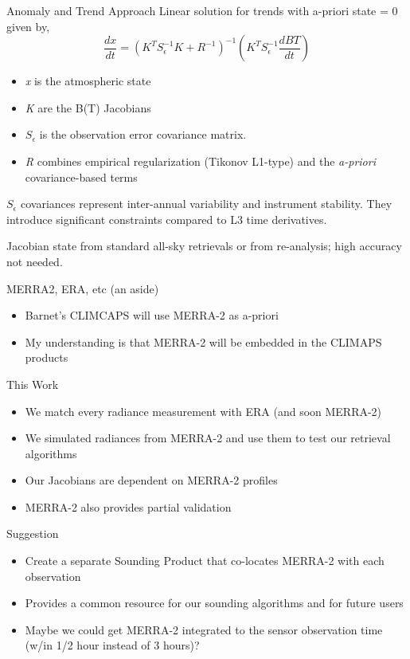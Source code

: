 \documentclass[10pt,t]{beamer}
\begin{document}
\begin{frame}[label={sec:orga73479f}]{Anomaly and Trend Approach}
Linear solution for trends with a-priori state = 0 given by,
\begin{displaymath}
\frac{dx}{dt} =  \left(K^T S_{\epsilon}^{-1} K + R^{-1}\right)^{-1} \left(K^T S_{\epsilon}^{-1} \frac{dBT}{dt}\right)
\end{displaymath}

\begin{itemize}
\item \emph{x} is the atmospheric state
\item \emph{K} are the B(T) Jacobians
\item \(S_{\epsilon}\) is the observation error covariance matrix.
\item \emph{R} combines empirical regularization (Tikonov L1-type) and the \emph{a-priori} covariance-based terms
\end{itemize}

\(S_\epsilon\) covariances represent inter-annual variability and instrument stability.  They introduce significant constraints compared to L3 time derivatives.

Jacobian state from standard all-sky retrievals or from re-analysis; high accuracy not needed.
\end{frame}

\begin{frame}[shrink=20,label={sec:org34a5c22}]{MERRA2, ERA, etc  (an aside)}
\begin{itemize}
\item Barnet's CLIMCAPS will use MERRA-2 as a-priori
\item My understanding is that MERRA-2 will be embedded in the CLIMAPS products
\end{itemize}

\begin{block}{This Work}
\begin{itemize}
\item We match every radiance measurement with ERA (and soon MERRA-2)
\item We simulated radiances from MERRA-2 and use them to test our retrieval algorithms
\item Our Jacobians are dependent on MERRA-2 profiles
\item MERRA-2 also provides partial validation
\end{itemize}
\end{block}

\begin{block}{Suggestion}
\begin{itemize}
\item Create a separate Sounding Product that co-locates MERRA-2 with each observation
\item Provides a common resource for our sounding algorithms and for future users
\item Maybe we could get MERRA-2 integrated to the sensor observation time (w/in 1/2 hour instead of 3 hours)?
\end{itemize}
\end{block}
\end{frame}
\end{document}
